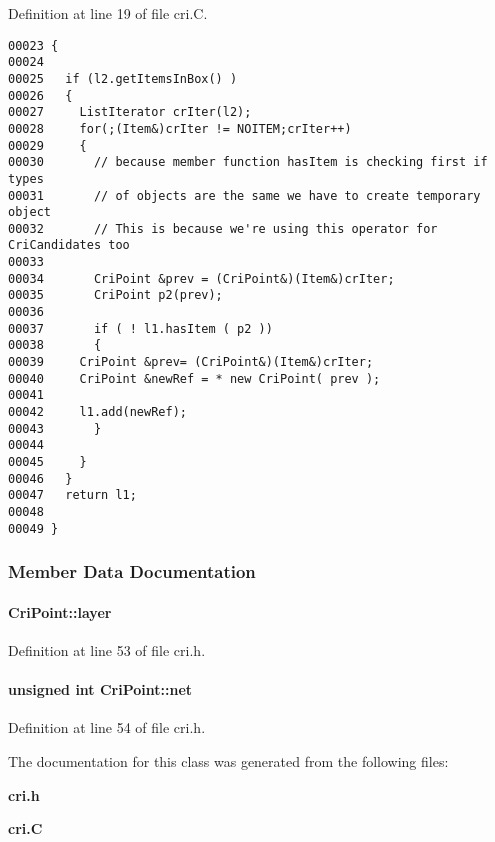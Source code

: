 Definition at line 19 of file cri.C.\small\begin{verbatim}00023 {
00024   
00025   if (l2.getItemsInBox() )
00026   {
00027     ListIterator crIter(l2);
00028     for(;(Item&)crIter != NOITEM;crIter++)
00029     {
00030       // because member function hasItem is checking first if types
00031       // of objects are the same we have to create temporary object
00032       // This is because we're using this operator for CriCandidates too
00033 
00034       CriPoint &prev = (CriPoint&)(Item&)crIter;
00035       CriPoint p2(prev);
00036 
00037       if ( ! l1.hasItem ( p2 ))
00038       {
00039     CriPoint &prev= (CriPoint&)(Item&)crIter;
00040     CriPoint &newRef = * new CriPoint( prev );
00041 
00042     l1.add(newRef);      
00043       }
00044 
00045     }
00046   }
00047   return l1;
00048   
00049 }
\end{verbatim}\normalsize 


\subsubsection{Member Data Documentation}
\label{CriPoint_m0}
\paragraph{ Cri\-Point::layer}\hfill



Definition at line 53 of file cri.h.\label{CriPoint_m1}
\paragraph{\setlength{\rightskip}{0pt plus 5cm}unsigned int Cri\-Point::net}\hfill



Definition at line 54 of file cri.h.

The documentation for this class was generated from the following files:\begin{CompactItemize}
\item 
{\bf cri.h}\item 
{\bf cri.C}\end{CompactItemize}
